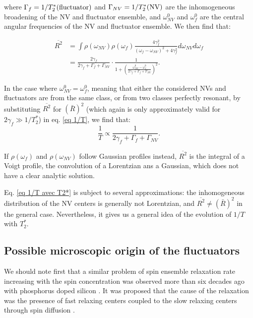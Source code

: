 \documentclass[a4paper,11pt]{report}
\begin{document}
where $\Gamma_{f}=1/T_2^*(\rm fluctuator)$ and $\Gamma_{NV}=1/T_2^*(\rm NV)$ are the inhomogeneous broadening of the NV and fluctuator ensemble, and $\omega^0_{NV}$ and $\omega^0_{f}$ are the central angular frequencies of the NV and fluctuator ensemble. We then find that:

\begin{align*}
\overline{R^2}&= \int \rho(\omega_{NV}) \rho(\omega_{f}) \frac{4\gamma_f^2}{(\omega_f - \omega_{NV})^2+4\gamma_f^2} d\omega_{NV} d\omega_{f} \\
&=\frac{2 \gamma_f}{2 \gamma_f + \Gamma_f + \Gamma_{NV}} \cdot \frac{1}{1+\left(\frac{\omega^0_{NV}-\omega^0_{f}}{2 \gamma_f + \Gamma_f + \Gamma_{NV}}\right)^2}.
\end{align*}

In the case where $\omega^0_{NV}=\omega^0_{f}$, meaning that either the considered NVs and fluctuators are from the same class, or from two classes perfectly resonant, by substituting $\overline{R ^2}$ for $(\bar{R})^2$ (which again is only approximately valid for $2 \gamma_f \gg 1/T_2^*$) in eq. \ref{eq 1/T}, we find that:
\begin{equation}
\label{eq 1/T avec T2*}
\frac{1}{T} \propto \frac{1}{2\gamma_f + \Gamma_f + \Gamma_{NV}}.
\end{equation}

If $\rho(\omega_{f})$ and $\rho(\omega_{NV})$ follow Gaussian profiles instead, $\overline{R^2}$ is the integral of a Voigt profile, the convolution of a Lorentzian ans a Gaussian, which does not have a clear analytic solution.

Eq. \ref{eq 1/T avec T2*} is subject to several approximations: the inhomogeneous distribution of the NV centers is generally not Lorentzian, and $\overline{R^2} \neq (\bar{R})^2$ in the general case. Nevertheless, it gives us a general idea of the evolution of $1/T$ with $T_2^*$.

 \subsection{Possible microscopic origin of the fluctuators}

We should note first that a similar problem of spin ensemble relaxation rate increasing with the spin concentration was observed more than six decades ago with phosphorus doped silicon \citep{feher1959electron,honig1960electron}. It was proposed that the cause of the relaxation was the presence of fast relaxing centers coupled to the slow relaxing centers through spin diffusion \citep{honig1960electron, sugihara1963spin, yang1968concentration, vugmeister1978spin, berman2005spin}. 
\end{document}
